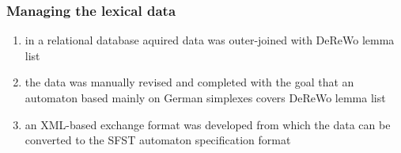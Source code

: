 \documentclass {beamer}
\begin{document}


\frame
{
  \frametitle{Managing the lexical data}
\begin{enumerate} 
\item in a relational database aquired data was outer-joined with DeReWo lemma list
\item the data was manually revised and completed with the goal that an automaton 
based mainly on German simplexes covers DeReWo lemma list
\item an XML-based exchange format was developed from which the data can be converted to the SFST automaton specification format
\end{enumerate}
}

\end{document}
